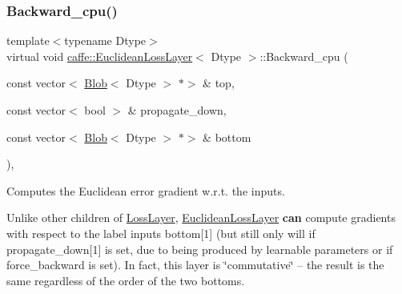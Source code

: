 \subsubsection{\texorpdfstring{Backward\+\_\+cpu()}{Backward\_cpu()}\hspace{0.1cm}{\footnotesize\ttfamily [2/2]}}
{\footnotesize\ttfamily template$<$typename Dtype$>$ \\
virtual void \mbox{\hyperlink{classcaffe_1_1_euclidean_loss_layer}{caffe\+::\+Euclidean\+Loss\+Layer}}$<$ Dtype $>$\+::Backward\+\_\+cpu (\begin{DoxyParamCaption}\item[{const vector$<$ \mbox{\hyperlink{classcaffe_1_1_blob}{Blob}}$<$ Dtype $>$ $\ast$$>$ \&}]{top,  }\item[{const vector$<$ bool $>$ \&}]{propagate\+\_\+down,  }\item[{const vector$<$ \mbox{\hyperlink{classcaffe_1_1_blob}{Blob}}$<$ Dtype $>$ $\ast$$>$ \&}]{bottom }\end{DoxyParamCaption})\hspace{0.3cm}{\ttfamily [protected]}, {\ttfamily [virtual]}}



Computes the Euclidean error gradient w.\+r.\+t. the inputs. 

Unlike other children of \mbox{\hyperlink{classcaffe_1_1_loss_layer}{Loss\+Layer}}, \mbox{\hyperlink{classcaffe_1_1_euclidean_loss_layer}{Euclidean\+Loss\+Layer}} {\bfseries can} compute gradients with respect to the label inputs bottom\mbox{[}1\mbox{]} (but still only will if propagate\+\_\+down\mbox{[}1\mbox{]} is set, due to being produced by learnable parameters or if force\+\_\+backward is set). In fact, this layer is \char`\"{}commutative\char`\"{} -- the result is the same regardless of the order of the two bottoms.


